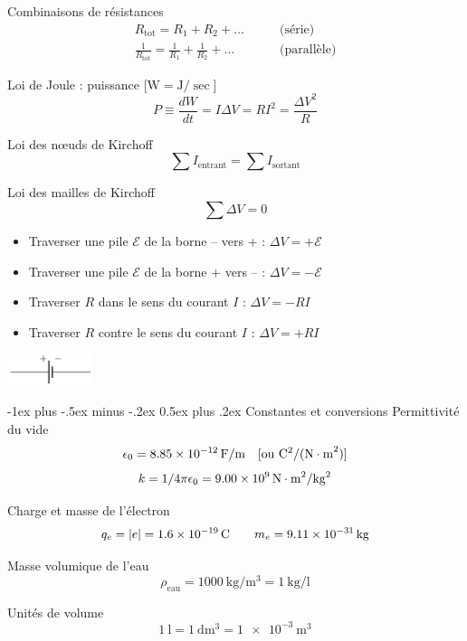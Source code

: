 \documentclass[10pt,landscape]{article}
\makeatletter
\renewcommand{\section}{\@startsection{section}{1}{0mm}%
                                {-1ex plus -.5ex minus -.2ex}%
                                {0.5ex plus .2ex}%
                                {\normalfont\large\bfseries}}
\newcommand{\emf}{\ensuremath{\mathcal{E}}}
\makeatother
\begin{document}
\begin{multicols}{3}
Combinaisons de résistances
\begin{align*}
R_\text{tot} = R_1 + R_2 + \dots \qquad & \text{(série)} \\
\frac{1}{R_\text{tot}} = \frac{1}{R_1} + \frac{1}{R_2} + \dots \qquad & \text{(parallèle)}
\end{align*}

Loi de Joule : puissance [$\si{\watt} = \si{\joule}/\si{\sec}$]
\[ P \equiv \frac{dW}{dt} = I \Delta V = R I^2  = \frac{\Delta V^2}{R}\]

Loi des nœuds de Kirchoff
\[ \sum I_\text{entrant} = \sum I_\text{sortant} \]

Loi des mailles de Kirchoff
\[ \sum \Delta V = 0 \]

\begin{itemize}
\item Traverser une pile $\emf$ de la borne -- vers + : $\Delta V  = +\emf$
\item Traverser une pile $\emf$ de la borne + vers -- : $\Delta V  = -\emf$
\item Traverser $R$ dans le sens du courant $I$ : $\Delta V  = -RI$
\item Traverser $R$ contre le sens du courant $I$ : $\Delta V  = +RI$
\end{itemize}

\begin{center}
	\includegraphics[width=25mm]{./phy1522/pile.png}
\end{center}

\hrulefill
\section{Constantes et conversions}
Permittivité du vide
\[ 	\epsilon_0 = \SI{8,85E-12}{{\farad}/{\meter}} \quad [\text{ou } \si{{\coulomb^2}/{(\newton\cdot\meter^2)}}] \]
\[	k = {1}/{4\pi\epsilon_0} = \SI{9,00E9}{\newton\cdot\meter^2/\kilogram^2}\]

Charge et masse de l'électron
\begin{gather*}
q_e = |e| = \SI{1,6E-19}{\coulomb}
\qquad m_e = \SI{9,11E-31}{\kilogram}
\end{gather*}

Masse volumique de l'eau
\[ \rho_\text{eau} = \SI{1000}{\kilogram/\meter^3}  = \SI{1}{\kilogram/\litre} \]

Unités de volume
\[ \SI{1}{\litre} = \SI{1}{\deci\meter^3} =  \SI{1e-3}{\meter^3} \]


\end{multicols}
\end{document}
